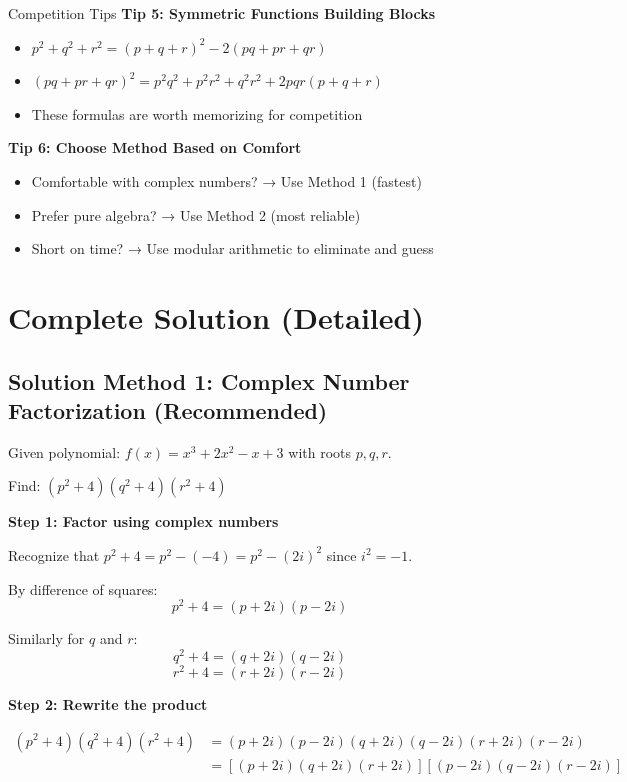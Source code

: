 \documentclass[12pt]{article}
\begin{document}
\begin{protipbox}{Competition Tips}
\textbf{Tip 5: Symmetric Functions Building Blocks}
\begin{itemize}
    \item $p^2 + q^2 + r^2 = (p+q+r)^2 - 2(pq+pr+qr)$
    \item $(pq + pr + qr)^2 = p^2q^2 + p^2r^2 + q^2r^2 + 2pqr(p+q+r)$
    \item These formulas are worth memorizing for competition
\end{itemize}

\textbf{Tip 6: Choose Method Based on Comfort}
\begin{itemize}
    \item Comfortable with complex numbers? → Use Method 1 (fastest)
    \item Prefer pure algebra? → Use Method 2 (most reliable)
    \item Short on time? → Use modular arithmetic to eliminate and guess
\end{itemize}

\end{protipbox}

\section*{Complete Solution (Detailed)}

\subsection*{Solution Method 1: Complex Number Factorization (Recommended)}

Given polynomial: $f(x) = x^3 + 2x^2 - x + 3$ with roots $p, q, r$.

Find: $(p^2 + 4)(q^2 + 4)(r^2 + 4)$

\textbf{Step 1: Factor using complex numbers}

Recognize that $p^2 + 4 = p^2 - (-4) = p^2 - (2i)^2$ since $i^2 = -1$.

By difference of squares:
\[p^2 + 4 = (p + 2i)(p - 2i)\]

Similarly for $q$ and $r$:
\[q^2 + 4 = (q + 2i)(q - 2i)\]
\[r^2 + 4 = (r + 2i)(r - 2i)\]

\textbf{Step 2: Rewrite the product}

\begin{align*}
(p^2 + 4)(q^2 + 4)(r^2 + 4) &= (p + 2i)(p - 2i)(q + 2i)(q - 2i)(r + 2i)(r - 2i)\\
&= [(p + 2i)(q + 2i)(r + 2i)][(p - 2i)(q - 2i)(r - 2i)]
\end{align*}
\end{document}
